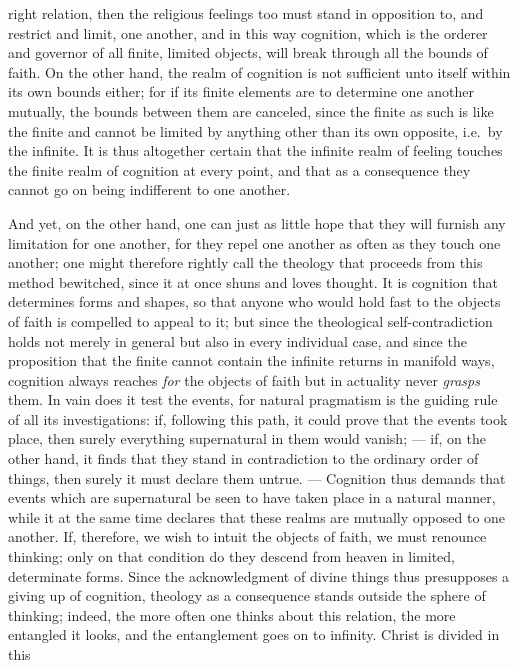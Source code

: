 \documentclass[12pt]{book}
\newcommand{\opage}[1]{\marginnote{\footnotesize\textit{[#1]}}}
\begin{document}
right relation, then the religious feelings too must stand in
\opage{123} opposition to, and restrict and limit, one another, and in this way
cognition, which is the orderer and governor of all finite, limited objects,
will break through all the bounds of faith. On the other hand, the realm of
cognition is not sufficient unto itself within its own bounds either; for if
its finite elements are to determine one another mutually, the bounds between
them are canceled, since the finite as such is like the finite and cannot be
limited by anything other than its own opposite, i.e.\ by the infinite. It is
thus altogether certain that the infinite realm of feeling touches the finite
realm of cognition at every point, and that as a consequence they cannot go on
being indifferent to one another.

And yet, on the other hand, one can just as little hope that they will
furnish any limitation for one another, for they repel one another as often
as they touch one another; one might therefore rightly call the theology that
proceeds from this method bewitched, since it at once shuns and loves
thought. It is cognition that determines forms and shapes, so that anyone who
would hold fast to the objects of faith is compelled to appeal to it; but
since the theological self-contradiction holds not merely in general but also
in every individual case, and since the proposition that the finite cannot
contain the infinite returns in manifold ways, cognition always reaches
\emph{for} the objects of faith but in actuality never \emph{grasps} them. In
vain does it test the events, for natural pragmatism is the guiding rule of all
its investigations: if, following this path, it could prove that the events
took place, then surely everything supernatural in them would vanish; --- if,
on the other hand, it finds that they stand in contradiction to the ordinary
order of things, then surely it must declare them
\opage{124} untrue. --- Cognition thus demands that events which are supernatural be seen
to have taken place in a natural manner, while it at the same time declares
that these realms are mutually opposed to one another. If, therefore, we wish
to intuit the objects of faith, we must renounce thinking; only on that
condition do they descend from heaven in limited, determinate forms. Since
the acknowledgment of divine things thus presupposes a giving up of
cognition, theology as a consequence stands outside the sphere of thinking;
indeed, the more often one thinks about this relation, the more entangled it
looks, and the entanglement goes on to infinity. Christ is divided in this
\end{document}
